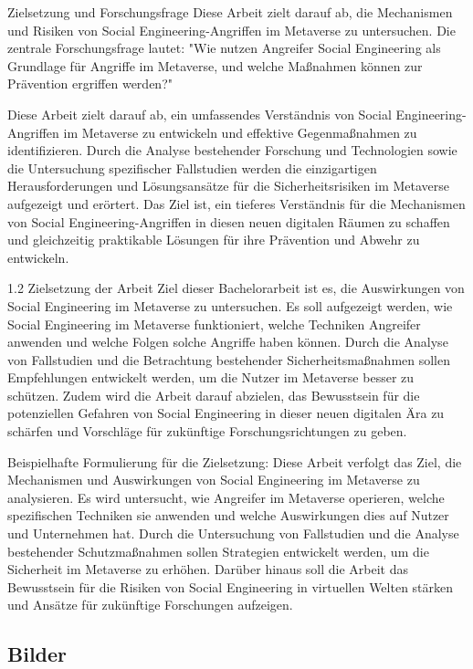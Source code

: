 Zielsetzung und Forschungsfrage
Diese Arbeit zielt darauf ab, die Mechanismen und Risiken von Social Engineering-Angriffen im Metaverse zu untersuchen. Die zentrale Forschungsfrage lautet: "Wie nutzen Angreifer Social Engineering als Grundlage für Angriffe im Metaverse, und welche Maßnahmen können zur Prävention ergriffen werden?"


Diese Arbeit zielt darauf ab, ein umfassendes Verständnis von Social Engineering-Angriffen im Metaverse zu entwickeln und effektive Gegenmaßnahmen zu identifizieren. Durch die Analyse bestehender Forschung und Technologien sowie die Untersuchung spezifischer Fallstudien werden die einzigartigen Herausforderungen und Lösungsansätze für die Sicherheitsrisiken im Metaverse aufgezeigt und erörtert. Das Ziel ist, ein tieferes Verständnis für die Mechanismen von Social Engineering-Angriffen in diesen neuen digitalen Räumen zu schaffen und gleichzeitig praktikable Lösungen für ihre Prävention und Abwehr zu entwickeln.


1.2 Zielsetzung der Arbeit
Ziel dieser Bachelorarbeit ist es, die Auswirkungen von Social Engineering im Metaverse zu untersuchen. Es soll aufgezeigt werden, wie Social Engineering im Metaverse funktioniert, welche Techniken Angreifer anwenden und welche Folgen solche Angriffe haben können. Durch die Analyse von Fallstudien und die Betrachtung bestehender Sicherheitsmaßnahmen sollen Empfehlungen entwickelt werden, um die Nutzer im Metaverse besser zu schützen. Zudem wird die Arbeit darauf abzielen, das Bewusstsein für die potenziellen Gefahren von Social Engineering in dieser neuen digitalen Ära zu schärfen und Vorschläge für zukünftige Forschungsrichtungen zu geben.

Beispielhafte Formulierung für die Zielsetzung:
Diese Arbeit verfolgt das Ziel, die Mechanismen und Auswirkungen von Social Engineering im Metaverse zu analysieren. Es wird untersucht, wie Angreifer im Metaverse operieren, welche spezifischen Techniken sie anwenden und welche Auswirkungen dies auf Nutzer und Unternehmen hat. Durch die Untersuchung von Fallstudien und die Analyse bestehender Schutzmaßnahmen sollen Strategien entwickelt werden, um die Sicherheit im Metaverse zu erhöhen. Darüber hinaus soll die Arbeit das Bewusstsein für die Risiken von Social Engineering in virtuellen Welten stärken und Ansätze für zukünftige Forschungen aufzeigen.



\subsection*{Bilder}

